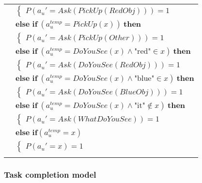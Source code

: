 \begin{footnotesize}
\begin{longtable}{p{1cm}l}
& \;\;\;\;\; $ \begin{cases}P(\mathit{a_u}'\!=\!\mathit{Ask(PickUp(RedObj))})\!=\!1 \end{cases}$ \vspace{1mm} \\ & $ \textbf{else if} \ (\mathit{a_u^{\text{temp}}}\!=\!\mathit{PickUp(x)}) \ \textbf{then}$ \\
& \;\;\;\;\; $ \begin{cases}P(\mathit{a_u}'\!=\!\mathit{Ask(PickUp(Other))})\!=\!1 \end{cases}$ \vspace{1mm} \\ & $ \textbf{else if} \ (\mathit{a_u^{\text{temp}}}\!=\!\mathit{DoYouSee({x})} \land \text{"red"}\!\in\!\mathit{x}) \ \textbf{then}$ \\
& \;\;\;\;\; $ \begin{cases}P(\mathit{a_u}'\!=\!\mathit{Ask(DoYouSee(RedObj))})\!=\!1 \end{cases}$ \vspace{1mm} \\ & $ \textbf{else if} \ (\mathit{a_u^{\text{temp}}}\!=\!\mathit{DoYouSee({x})} \land \text{"blue"}\!\in\!\mathit{x}) \ \textbf{then}$ \\
& \;\;\;\;\; $ \begin{cases}P(\mathit{a_u}'\!=\!\mathit{Ask(DoYouSee(BlueObj))})\!=\!1 \end{cases}$ \vspace{1mm} \\ & $ \textbf{else if} \ (\mathit{a_u^{\text{temp}}}\!=\!\mathit{DoYouSee({x})} \land \text{"it"}\!\notin\!\mathit{x}) \ \textbf{then}$ \\
& \;\;\;\;\; $ \begin{cases}P(\mathit{a_u}'\!=\!\mathit{Ask(WhatDoYouSee)})\!=\!1 \end{cases}$ \vspace{1mm} \\ & $ \textbf{else if} (\mathit{a_u^{\text{temp}}}\!=\!x)$ \\
& \;\;\;\;\; $ \begin{cases}P(\mathit{a_u}'\!=\!x)\!=\!1 \end{cases}$ \\ \\[-1mm]
\end{longtable}
\end{footnotesize}

\subsubsection*{Task completion model}

